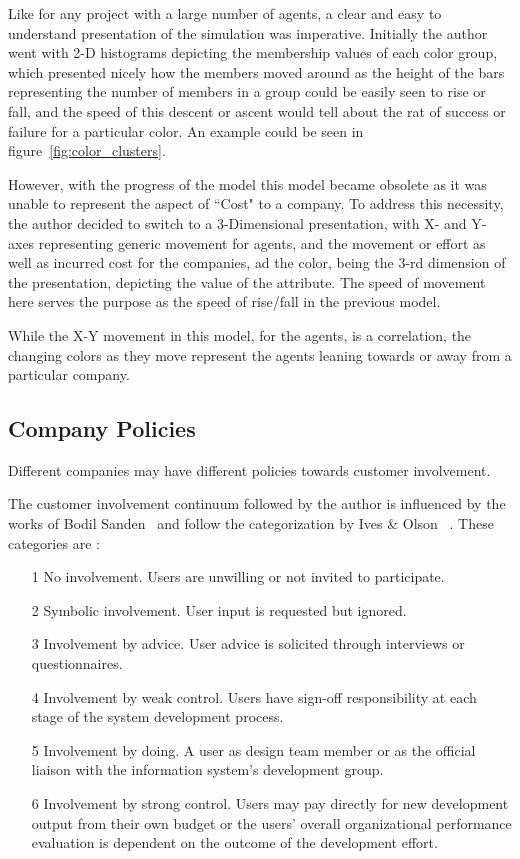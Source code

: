 Like for any project with a large number of agents, a clear and easy to understand presentation of the simulation was imperative.
Initially the author went with 2-D histograms depicting the membership values of each color group, which presented nicely how the members moved around as the height of the  bars representing the number of members in a group could be easily seen to rise or fall, and the speed of this descent or ascent would tell about the rat of success or failure for a particular color. An example could be seen in figure~\ref{fig:color_clusters}.


However, with the progress of the model this model became obsolete as it was unable to represent the aspect of ``Cost" to a company. 
To address this necessity, the author decided to switch to a 3-Dimensional presentation, with X- and Y- axes representing generic movement for agents, and the movement or effort as well as incurred cost for the companies, ad the color, being the 3-rd dimension of the presentation, depicting the value of the attribute. The speed of movement here serves the purpose as the speed of rise/fall in the previous model.

While the X-Y movement in this model, for the agents, is a correlation, the changing colors as they move represent the agents leaning towards or away from a particular company.

\subsection{Company Policies}

Different companies may have different policies towards customer involvement. 

The customer involvement continuum followed by the author is influenced by the works of Bodil Sanden~\cite{bodil} and follow the categorization by Ives \& Olson ~\cite{1984}.
These categories are :

\begin{enumerate}

\item[1] No involvement. Users are unwilling or not invited to participate.
\item[2] Symbolic involvement. User input is requested but ignored. 
\item[3] Involvement by advice. User advice is solicited through interviews
or questionnaires.
\item[4]  Involvement by weak control. Users have sign-off responsibility at
each stage of the system development process. 
\item[5] Involvement by doing. A user as design team member or as the
official liaison with the information system’s development group. 
\item[6] Involvement by strong control. Users may pay directly for new
development output from their own budget or the users’ overall
organizational performance evaluation is dependent on the
outcome of the development effort. 
\end{enumerate}

